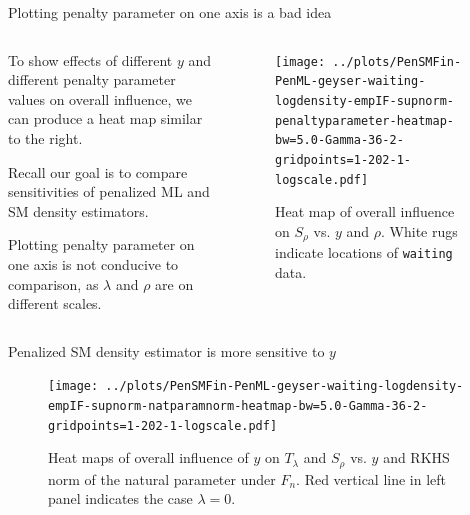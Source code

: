 \documentclass[aspectratio=169,xcolor=dvipsnames]{beamer}
\begin{document}
\begin{frame}{Plotting penalty parameter on one axis is a {\color{red} bad} idea}

	\begin{columns}[c]
	    \begin{column}{.6\textwidth}
	    
	    	To show effects of different $y$ and different penalty parameter values on overall influence, we can produce a heat map similar to the right. 
	    	
	    	\vspace{10pt}
	    	
	    	Recall our goal is to compare sensitivities of penalized ML and SM density estimators. 
	    	
	    	\vspace{10pt}
	    	
	    	Plotting penalty parameter on one axis is {\color{red} not} conducive to comparison, as $\lambda$ and $\rho$ are on different scales. 
	    	
		\end{column}
		
	    \begin{column}{.4\textwidth}
	    \begin{figure}
	        \centering
	        \texttt{[image: ../plots/PenSMFin-PenML-geyser-waiting-logdensity-empIF-supnorm-penaltyparameter-heatmap-bw=5.0-Gamma-36-2-gridpoints=1-202-1-logscale.pdf]}
	        \caption{Heat map of overall influence on $S_{\rho}$ vs. $y$ and $\rho$. White rugs indicate locations of \texttt{waiting} data.}
	    \end{figure}
	    \end{column}
	\end{columns}
\end{frame}


\begin{frame}{Penalized SM density estimator is more sensitive to $y$}

	\begin{figure}
		\centering
		\texttt{[image: ../plots/PenSMFin-PenML-geyser-waiting-logdensity-empIF-supnorm-natparamnorm-heatmap-bw=5.0-Gamma-36-2-gridpoints=1-202-1-logscale.pdf]}
		\caption{Heat maps of overall influence of $y$ on $T_{\lambda}$ and $S_{\rho}$ vs. $y$ and RKHS norm of the natural parameter under $F_n$. Red vertical line in left panel indicates the case $\lambda = 0$.}
	\end{figure}
	
\end{frame}
\end{document}
